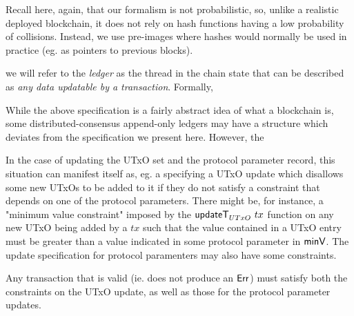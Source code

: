 Recall here, again, that our formalism is not probabilistic, so, unlike a realistic
deployed blockchain, it does not rely on hash functions having a low probability
of collisions. Instead, we use pre-images where hashes would normally be used in
practice (eg. as pointers to previous blocks).

we will refer to the \emph{ledger} as the thread in the
chain state that can be described as \emph{any data updatable by a transaction}. Formally,

While the above specification is a fairly abstract idea of what a blockchain is,
some distributed-consensus append-only ledgers may have a structure which deviates from the
specification we present here. However, the
\cite{Cardano-ledger-spec} \cite{tezos} \cite{ethereum} \cite{Nakamoto}



In the case of updating the UTxO set and the protocol parameter record, this
situation can manifest itself as, eg. a specifying a UTxO update which disallows some
new UTxOs to be added to it if they do not satisfy a constraint that depends on
one of the protocol parameters. There might be, for instance, a "minimum value constraint"
imposed by the $\mathsf{updateT}_{UTxO}~tx$ function
on any new UTxO being added by a $tx$ such that the value contained in a UTxO entry must be greater
than a value indicated in some protocol parameter in $\mathsf{minV}$. The update specification
for protocol paramenters may also have some constraints.

Any transaction that is valid (ie. does not produce an $\mathsf{Err}$) must satisfy both the
constraints on the UTxO update, as well as those for the protocol parameter updates.
